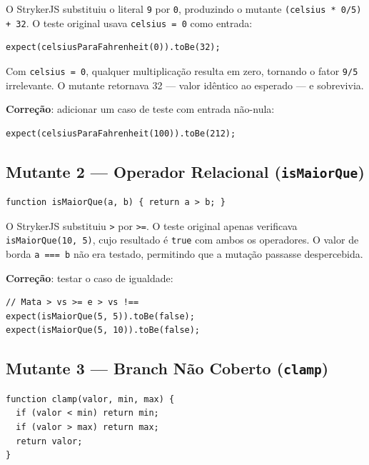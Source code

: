 \documentclass[conference]{IEEEtran}
\begin{document}
O StrykerJS substituiu o literal \texttt{9} por \texttt{0}, produzindo o
mutante \texttt{(celsius * 0/5) + 32}. O teste original usava
\texttt{celsius = 0} como entrada:

\begin{lstlisting}[caption={Teste original (fraco)}]
expect(celsiusParaFahrenheit(0)).toBe(32);
\end{lstlisting}

Com \texttt{celsius = 0}, qualquer multiplicação resulta em zero,
tornando o fator \texttt{9/5} irrelevante. O mutante retornava 32 —
valor idêntico ao esperado — e sobrevivia.

\textbf{Correção}: adicionar um caso de teste com entrada não-nula:

\begin{lstlisting}[caption={Teste eficaz adicionado}]
expect(celsiusParaFahrenheit(100)).toBe(212);
\end{lstlisting}

\subsection{Mutante 2 — Operador Relacional (\texttt{isMaiorQue})}

\begin{lstlisting}[caption={Código original — \texttt{isMaiorQue}}]
function isMaiorQue(a, b) { return a > b; }
\end{lstlisting}

O StrykerJS substituiu \texttt{>} por \texttt{>=}. O teste original apenas
verificava \texttt{isMaiorQue(10, 5)}, cujo resultado é \texttt{true} com
ambos os operadores. O valor de borda \texttt{a === b} não era testado,
permitindo que a mutação passasse despercebida.

\textbf{Correção}: testar o caso de igualdade:

\begin{lstlisting}[caption={Teste de borda adicionado}]
// Mata > vs >= e > vs !==
expect(isMaiorQue(5, 5)).toBe(false);
expect(isMaiorQue(5, 10)).toBe(false);
\end{lstlisting}

\subsection{Mutante 3 — Branch Não Coberto (\texttt{clamp})}

\begin{lstlisting}[caption={Código original — \texttt{clamp}}]
function clamp(valor, min, max) {
  if (valor < min) return min;
  if (valor > max) return max;
  return valor;
}
\end{lstlisting}
\end{document}
